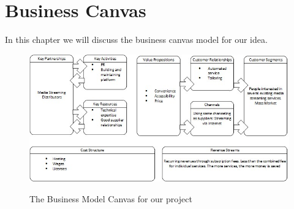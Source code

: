 \section{Business Canvas}
\label{sec:business_canvas}
In this chapter we will discuss the business canvas model for our idea.

\begin{figure}[h]
    \begin{center}
        \includegraphics[scale=0.7]{./pics/model_canvas}
        \label{fig:model_canvas}
        \caption{The Business Model Canvas for our project}
    \end{center}
\end{figure}